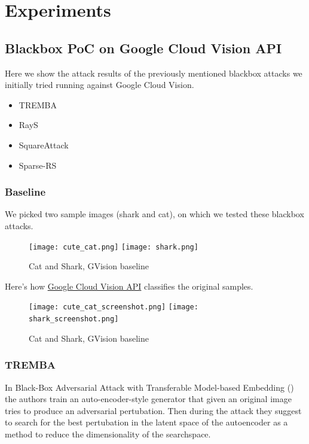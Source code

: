 \chapter{Experiments}
\label{experiments_chap}

\section{Blackbox PoC on Google Cloud Vision API}
Here we show the attack results of the previously mentioned blackbox attacks we initially tried running against Google Cloud Vision.

\begin{itemize}
    \item TREMBA
    \item RayS
    \item SquareAttack
    \item Sparse-RS
\end{itemize}

\subsection{Baseline}
We picked two sample images (shark and cat), on which we tested these blackbox attacks.

\begin{figure}[!htb]
\null\hspace{1cm}
  \texttt{[image: cute\_cat.png]}
\endminipage
\null\hspace{1cm}
  \texttt{[image: shark.png]}
\endminipage
\caption{Cat and Shark, GVision baseline}
\label{fig:cat_shark_original}
\end{figure}


Here's how \href{https://cloud.google.com/vision}{Google Cloud Vision API} classifies the original samples.

\begin{figure}[!htb]
  \texttt{[image: cute\_cat\_screenshot.png]}
\endminipage\hfill
{}
  \texttt{[image: shark\_screenshot.png]}
\endminipage\hfill
\caption{Cat and Shark, GVision baseline}
\label{fig:cat_shark_gvision_baseline}
\end{figure}


\subsection{TREMBA}
\label{tremba_poc}
In Black-Box Adversarial Attack with Transferable Model-based Embedding (\cite{Huang2020BlackBoxAA}) the authors train an auto-encoder-style generator that given an original image tries to produce an adversarial pertubation. Then during the attack they suggest to search for the best pertubation in the latent space of the autoencoder as a method to reduce the dimensionality of the searchspace.



